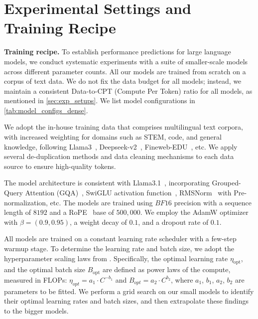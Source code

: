 \section{Experimental Settings and Training Recipe}
\label{append:setting}
\noindent\textbf{Training recipe.}
To establish performance predictions for large language models, we conduct systematic experiments with a suite of smaller-scale models across different parameter counts. All our models are trained from scratch on a corpus of text data. We do not fix the data budget for all models; instead, we maintain a consistent Data-to-CPT (Compute Per Token) ratio for all models, as mentioned in \cref{sec:exp_setups}. We list model configurations in \cref{tab:model_configs_dense}.

We adopt the in-house training data that comprises multilingual text corpora, with increased weighting for domains such as STEM, code, and general knowledge, following Llama3~\citep{grattafiori2024llama}, Deepseek-v2~\citep{liu2024deepseek}, Fineweb-EDU~\citep{lozhkov2024fineweb}, etc. We apply several de-duplication methods and data cleaning mechanisms to each data source to ensure high-quality tokens.

The model architecture is consistent with Llama3.1~\citep{grattafiori2024llama}, incorporating Grouped-Query Attention (GQA)~\citep{ainslie2023gqa}, SwiGLU activation function~\citep{shazeer2020glu}, RMSNorm~\citep{zhang2019root} with Pre-normalization, etc. The models are trained using $BF16$ precision with a sequence length of $8192$ and a RoPE~\cite{su2024roformer} base of $500,000$. We employ the AdamW optimizer with $\beta=(0.9,0.95)$, a weight decay of $0.1$, and a dropout rate of $0.1$.

All models are trained on a constant learning rate scheduler with a few-step warmup stage. To determine the learning rate and batch size, we adopt the hyperparameter scaling laws from \citet{liu2024deepseek}. Specifically, the optimal learning rate $\eta_{\mathrm{opt}}$, and the optimal batch size $B_{\mathrm{opt}}$ are defined as power laws of the compute, measured in FLOPs: $\eta_{opt}=a_1\cdot C^{-b_1}$ and $B_{opt}=a_2\cdot C^{b_2}$, where $a_1$, $b_1$, $a_2$, $b_2$ are parameters to be fitted. We perform a grid search on our small models to identify their optimal learning rates and batch sizes, and then extrapolate these findings to the bigger models.

